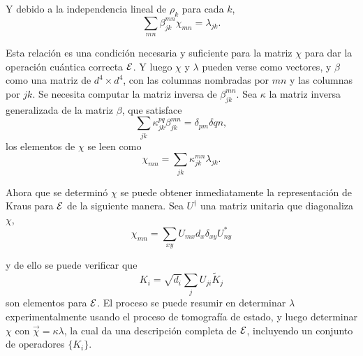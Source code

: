 Y debido a la independencia lineal de $\rho_k$ para cada $k$, 
\begin{equation}
    \sum_{mn}\beta_{jk}^{mn}\chi_{mn}=\lambda_{jk}.
\end{equation}

Esta relación es una condición necesaria y suficiente para la matriz $\chi$ para dar la operación cuántica correcta $\mathcal{E}$. Y luego $\chi$ y $\lambda$ pueden verse como vectores, y $\beta$ como una matriz de $d^4\times d^4$, con las columnas nombradas por ${mn}$ y las columnas por ${jk}$. Se necesita computar la matriz inversa de $\beta_{jk}^{mn}$. Sea $\kappa$ la matriz inversa generalizada de la matriz $\beta$, que satisface \[\sum_{jk}\kappa_{jk}^{pq}\beta_{jk}^{mn}=\delta_{pm}\delta{qn},\] los elementos de $\chi$ se leen como 
\begin{equation}
    \chi_{mn}=\sum_{jk}\kappa_{jk}^{mn}\lambda_{jk}.
\end{equation}

Ahora que se determinó $\chi$ se puede obtener inmediatamente la representación de Kraus para $\mathcal{E}$ de la siguiente manera. Sea $U^\dagger$ una matriz unitaria que diagonaliza $\chi$,
\begin{equation}
    \chi_{mn}=\sum_{xy}U_{mx}d_x\delta_{xy}U_{ny}^*
\end{equation}

y de ello se puede verificar que  \begin{equation}
    K_i=\sqrt{d_i} \sum_j U_{ji}\tilde{K}_j
\end{equation} son elementos para $\mathcal{E}$. El proceso se puede resumir en determinar $\lambda$ experimentalmente usando el proceso de tomografía de estado, y luego determinar $\chi$ con $\vec{\chi}=\kappa\lambda$, la cual da una descripción completa de $\mathcal{E}$, incluyendo un conjunto de operadores $\{K_i\}$.








